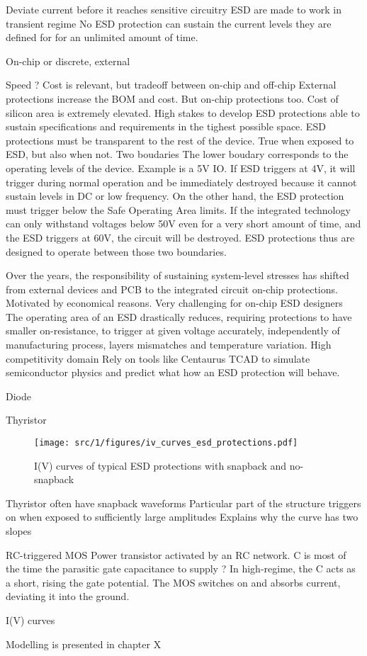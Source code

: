 Deviate current before it reaches sensitive circuitry
ESD are made to work in transient regime
No ESD protection can sustain the current levels they are defined for for an unlimited amount of time.

On-chip or discrete, external

Speed ?
Cost is relevant, but tradeoff between on-chip and off-chip
External protections increase the BOM and cost.
But on-chip protections too.
Cost of silicon area is extremely elevated.
High stakes to develop ESD protections able to sustain specifications and requirements in the tighest possible space.
ESD protections must be transparent to the rest of the device.
True when exposed to ESD, but also when not.
Two boudaries
The lower boudary corresponds to the operating levels of the device.
Example is a 5V IO.
If ESD triggers at 4V, it will trigger during normal operation and be immediately destroyed because it cannot sustain levels in DC or low frequency.
On the other hand, the ESD protection must trigger below the Safe Operating Area limits.
If the integrated technology can only withstand voltages below 50V even for a very short amount of time, and the ESD triggers at 60V, the circuit will be destroyed.
ESD protections thus are designed to operate between those two boundaries.

Over the years, the responsibility of sustaining system-level stresses has shifted from external devices and PCB to the integrated circuit on-chip protections.
Motivated by economical reasons.
Very challenging for on-chip ESD designers
The operating area of an ESD drastically reduces, requiring protections to have smaller on-resistance, to trigger at given voltage accurately, independently of manufacturing process, layers mismatches and temperature variation.
High competitivity domain
Rely on tools like Centaurus TCAD to simulate semiconductor physics and predict what how an ESD protection will behave.


Diode


Thyristor

\begin{figure}[!h]
  \centering
  \texttt{[image: src/1/figures/iv\_curves\_esd\_protections.pdf]}
  \caption{I(V) curves of typical ESD protections with snapback and no-snapback}
  \label{fig:iv-curve-esd-protection}
\end{figure}

Thyristor often have snapback waveforms
Particular part of the structure triggers on when exposed to sufficiently large amplitudes
Explains why the curve has two slopes

RC-triggered MOS
Power transistor activated by an RC network.
C is most of the time the parasitic gate capacitance to supply ?
In high-regime, the C acts as a short, rising the gate potential.
The MOS switches on and absorbs current, deviating it into the ground.

I(V) curves



Modelling is presented in chapter X
